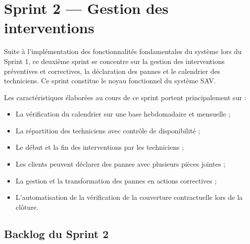 \newpage
\pagestyle{fancy}
\renewcommand{\headrulewidth}{0.5pt}
\renewcommand{\footrulewidth}{0.5pt}
\chapter{Sprint 2 --- Gestion des interventions}\setlength{\headheight}{28pt}
\label{ch4}
\thispagestyle{empty}
\minitoc
\newpage

Suite à l'implémentation des fonctionnalités fondamentales du système lors du Sprint 1, ce deuxième
sprint se concentre sur la gestion des interventions préventives et correctives, la déclaration des
pannes et le calendrier des techniciens. Ce sprint constitue le noyau fonctionnel du système SAV.

Les caractéristiques élaborées au cours de ce sprint portent principalement sur :

\begin{itemize}
    \item La vérification du calendrier sur une base hebdomadaire et mensuelle ;
    \item La répartition des techniciens avec contrôle de disponibilité ;
    \item Le début et la fin des interventions par les techniciens ;
    \item Les clients peuvent déclarer des pannes avec plusieurs pièces jointes ;
    \item La gestion et la transformation des pannes en actions correctives ;
    \item L'automatisation de la vérification de la couverture contractuelle lors de la clôture.
\end{itemize}

\section{Backlog du Sprint 2}

